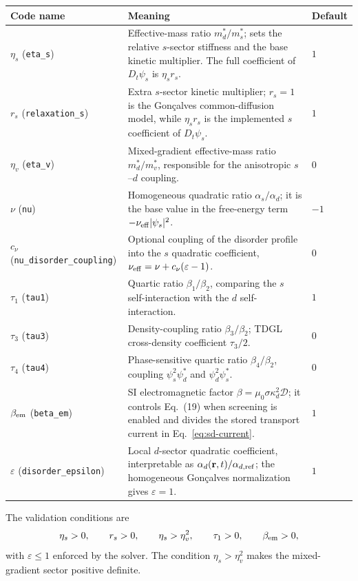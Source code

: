 \documentclass[11pt]{article}
\begin{document}
{\small
\begin{longtable}{@{}p{}p{}p{}@{}}
\toprule
Code name & Meaning & Default\\
\midrule
\endhead
$\eta_s$ (\texttt{eta\_s}) & Effective-mass ratio $m_d^*/m_s^*$; sets the relative $s$-sector stiffness and the base kinetic multiplier.  The full coefficient of $D_t\psi_s$ is $\eta_s r_s$. & $1$\\
$r_s$ (\texttt{relaxation\_s}) & Extra $s$-sector kinetic multiplier; $r_s=1$ is the Gon\c{c}alves common-diffusion model, while $\eta_s r_s$ is the implemented $s$ coefficient of $D_t\psi_s$. & $1$\\
$\eta_v$ (\texttt{eta\_v}) & Mixed-gradient effective-mass ratio $m_d^*/m_v^*$, responsible for the anisotropic $s$--$d$ coupling. & $0$\\
$\nu$ (\texttt{nu}) & Homogeneous quadratic ratio $\alpha_s/\alpha_d$; it is the base value in the free-energy term $-\nu_{\rm eff}|\psi_s|^2$. & $-1$\\
$c_\nu$ (\texttt{nu\_\allowbreak disorder\_\allowbreak coupling}) & Optional coupling of the disorder profile into the $s$ quadratic coefficient, $\nu_{\rm eff}=\nu+c_\nu(\varepsilon-1)$. & $0$\\
$\tau_1$ (\texttt{tau1}) & Quartic ratio $\beta_1/\beta_2$, comparing the $s$ self-interaction with the $d$ self-interaction. & $1$\\
$\tau_3$ (\texttt{tau3}) & Density-coupling ratio $\beta_3/\beta_2$; TDGL cross-density coefficient $\tau_3/2$. & $0$\\
$\tau_4$ (\texttt{tau4}) & Phase-sensitive quartic ratio $\beta_4/\beta_2$, coupling $\psi_s^2\psi_d^*$ and $\psi_d^2\psi_s^*$. & $0$\\
$\beta_{\rm em}$ (\texttt{beta\_em}) & SI electromagnetic factor $\beta=\mu_0\sigma\kappa_d^2\mathcal D$; it controls Eq.~(19) when screening is enabled and divides the stored transport current in Eq.~\eqref{eq:sd-current}. & $1$\\
$\varepsilon$ (\texttt{disorder\_\allowbreak epsilon}) & Local $d$-sector quadratic coefficient, interpretable as $\alpha_d(\mathbf r,t)/\alpha_{d,\rm ref}$; the homogeneous Gon\c{c}alves normalization gives $\varepsilon=1$. & $1$\\
\bottomrule
\end{longtable}
}

The validation conditions are
\begin{equation}
    \eta_s>0,\qquad r_s>0,\qquad \eta_s>\eta_v^2,\qquad
    \tau_1>0,\qquad \beta_{\rm em}>0,
\end{equation}
with $\varepsilon\leq1$ enforced by the solver.  The condition
$\eta_s>\eta_v^2$ makes the mixed-gradient sector positive definite.
\end{document}
